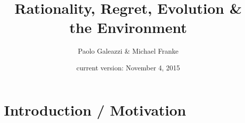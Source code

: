 \documentclass[fleqn,reqno,11pt]{article}
\title{Rationality, Regret, Evolution \& the Environment}
\author{Paolo Galeazzi \& Michael Franke}
\date{current version: November 4, 2015}
\newcommand{\myalert}[1]{\textcolor{red}{#1}}
\begin{document}




\maketitle

\section{Introduction / Motivation}
\label{sec:intr--motiv}
\end{document}
